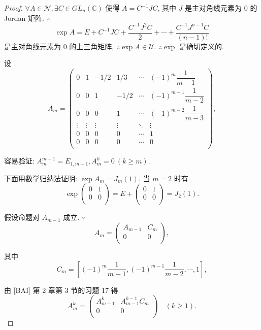 \documentclass[color=black,device=normal,lang=cn,mode=geye]{elegantnote}
\begin{document}
\begin{proof}
    $\forall A\in\mathscr{N},\exists C\in GL_n(\mathbb{C})$ 使得 $A=C^{-1}JC$, 其中 $J$ 是主对角线元素为 $0$ 的 Jordan 矩阵. $\therefore$
    \[\exp A=E+C^{-1}JC+\dfrac{C^{-1}J^2C}{2}+\cdots+\dfrac{C^{-1}J^{n-1}C}{(n-1)!}\]
    是主对角线元素为 $0$ 的上三角矩阵, $\therefore\exp A\in\mathscr{U}$. $\therefore\exp$ 是确切定义的.

    设
    \[A_m=\begin{pmatrix}
        0 & 1 & -1/2 & 1/3 & \cdots & (-1)^m\dfrac{1}{m-1} \\
        0 & 0 & 1 & -1/2 & \cdots & (-1)^{m-1}\dfrac{1}{m-2} \\
        0 & 0 & 0 & 1 & \cdots & (-1)^{m-2}\dfrac{1}{m-3} \\
        \vdots & \vdots & \vdots & \vdots & \ddots & \vdots \\
        0 & 0 & 0 & 0 & \cdots & 1 \\
        0 & 0 & 0 & 0 & \cdots & 0 \\
    \end{pmatrix},\]

    容易验证: $A_m^{m-1}=E_{1,m-1},A_m^k=0\ (k\geq m)$.

    下面用数学归纳法证明: $\exp A_m=J_m(1)$. 当 $m=2$ 时有
    \[\exp\begin{pmatrix}
        0 & 1 \\
        0 & 0 \\
    \end{pmatrix}=E+\begin{pmatrix}
        0 & 1 \\
        0 & 0 \\
    \end{pmatrix}=J_2(1).\]

    假设命题对 $A_{m-1}$ 成立. $\because$
    \[A_m=\begin{pmatrix}
        A_{m-1} & C_m \\
        0 & 0 \\
    \end{pmatrix},\]

    其中
    \[C_m=\left[(-1)^m\dfrac{1}{m-1},(-1)^{m-1}\dfrac{1}{m-2},\cdots,1\right],\]

    由 [BAI] 第 2 章第 3 节的习题 17 得
    \[A_m^k=\begin{pmatrix}
        A_{m-1}^k & A_{m-1}^{k-1}C_m \\
        0 & 0 \\
    \end{pmatrix}\quad(k\geq1).\]


\end{proof}
\end{document}
